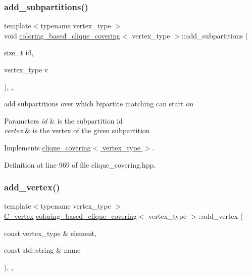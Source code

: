 \subsubsection{\texorpdfstring{add\+\_\+subpartitions()}{add\_subpartitions()}}
{\footnotesize\ttfamily template$<$typename vertex\+\_\+type $>$ \\
void \hyperlink{classcoloring__based__clique__covering}{coloring\+\_\+based\+\_\+clique\+\_\+covering}$<$ vertex\+\_\+type $>$\+::add\+\_\+subpartitions (\begin{DoxyParamCaption}\item[{\hyperlink{tutorial__fpt__2017_2intro_2sixth_2test_8c_a7c94ea6f8948649f8d181ae55911eeaf}{size\+\_\+t}}]{id,  }\item[{vertex\+\_\+type}]{v }\end{DoxyParamCaption})\hspace{0.3cm}{\ttfamily [inline]}, {\ttfamily [override]}, {\ttfamily [virtual]}}



add subpartitions over which bipartite matching can start on 


\begin{DoxyParams}{Parameters}
{\em id} & is the subpartition id \\
\hline
{\em vertex} & is the vertex of the given subpartition \\
\hline
\end{DoxyParams}


Implements \hyperlink{classclique__covering_a5d40053f9ab862b4db09ec41964e0617}{clique\+\_\+covering$<$ vertex\+\_\+type $>$}.



Definition at line 969 of file clique\+\_\+covering.\+hpp.

\mbox{\label{classcoloring__based__clique__covering_a1cac12eca65c32da20c7e8aee33ebf65}} 
\subsubsection{\texorpdfstring{add\+\_\+vertex()}{add\_vertex()}}
{\footnotesize\ttfamily template$<$typename vertex\+\_\+type $>$ \\
\hyperlink{clique__covering__graph_8hpp_a9cb45047ea8c5ed95a8cfa90494345aa}{C\+\_\+vertex} \hyperlink{classcoloring__based__clique__covering}{coloring\+\_\+based\+\_\+clique\+\_\+covering}$<$ vertex\+\_\+type $>$\+::add\+\_\+vertex (\begin{DoxyParamCaption}\item[{const vertex\+\_\+type \&}]{element,  }\item[{const std\+::string \&}]{name }\end{DoxyParamCaption})\hspace{0.3cm}{\ttfamily [inline]}, {\ttfamily [override]}, {\ttfamily [virtual]}}



